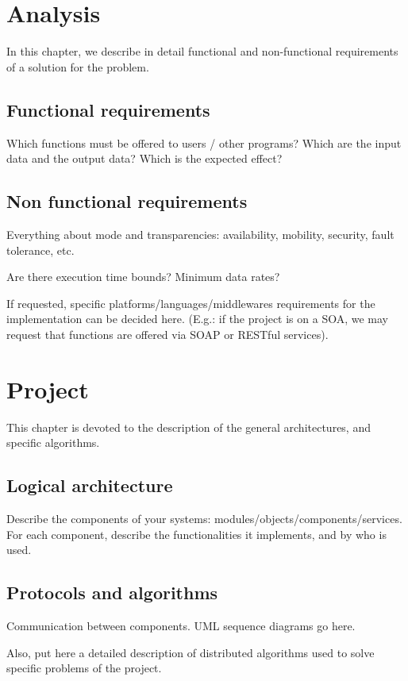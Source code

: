 \documentclass{memoir}
\begin{document}
\chapter{Analysis}\label{ch:analysis}

In this chapter, we describe in detail functional and non-functional requirements of a solution for the problem.

\section{Functional requirements}
Which functions must be offered to users / other programs?  Which are the input data and the output data? Which is the expected effect? 

\section{Non functional requirements}
Everything about mode and transparencies: availability, mobility, security, fault tolerance, etc.

Are there execution time bounds? Minimum data rates?

If requested, specific platforms/languages/middlewares requirements for the implementation can be decided here. (E.g.: if the project is on a SOA, we may request that functions are offered via SOAP or RESTful services). 



\chapter{Project}

This chapter is devoted to the description of the general architectures, and specific algorithms.

\section{Logical architecture}
Describe the components of your systems: modules/objects/components/services.
For each component, describe the functionalities it implements, and by who is used.

\section{Protocols and algorithms}
Communication between components.  UML sequence diagrams go here.

Also, put here a detailed description of distributed algorithms used to solve specific problems of the project.
\end{document}
